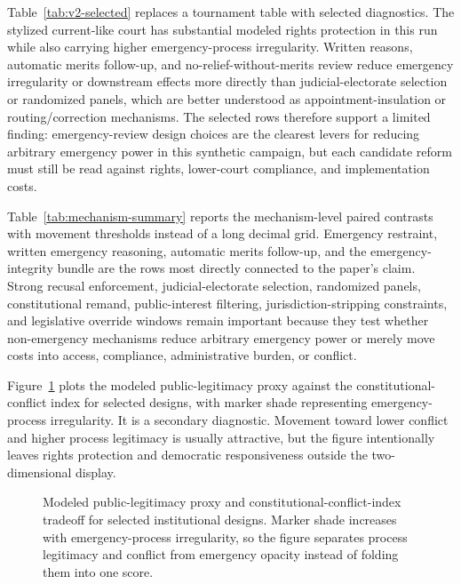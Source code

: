\documentclass[
    journal=jlc,
    manuscript=research-article,
    year=2026,
  ]{cup-journal}
\providecommand{\Description}[1]{}
\begin{document}


Table~\ref{tab:v2-selected} replaces a tournament table with selected diagnostics. The stylized current-like court has substantial modeled rights protection in this run while also carrying higher emergency-process irregularity. Written reasons, automatic merits follow-up, and no-relief-without-merits review reduce emergency irregularity or downstream effects more directly than judicial-electorate selection or randomized panels, which are better understood as appointment-insulation or routing/correction mechanisms. The selected rows therefore support a limited finding: emergency-review design choices are the clearest levers for reducing arbitrary emergency power in this synthetic campaign, but each candidate reform must still be read against rights, lower-court compliance, and implementation costs.



Table~\ref{tab:mechanism-summary} reports the mechanism-level paired contrasts with movement thresholds instead of a long decimal grid. Emergency restraint, written emergency reasoning, automatic merits follow-up, and the emergency-integrity bundle are the rows most directly connected to the paper's claim. Strong recusal enforcement, judicial-electorate selection, randomized panels, constitutional remand, public-interest filtering, jurisdiction-stripping constraints, and legislative override windows remain important because they test whether non-emergency mechanisms reduce arbitrary emergency power or merely move costs into access, compliance, administrative burden, or conflict.

Figure~\ref{fig:conflict-confidence} plots the modeled public-legitimacy proxy against the constitutional-conflict index for selected designs, with marker shade representing emergency-process irregularity. It is a secondary diagnostic. Movement toward lower conflict and higher process legitimacy is usually attractive, but the figure intentionally leaves rights protection and democratic responsiveness outside the two-dimensional display.

\begin{figure}[hbt!]
\centering

\caption{Modeled public-legitimacy proxy and constitutional-conflict-index tradeoff for selected institutional designs. Marker shade increases with emergency-process irregularity, so the figure separates process legitimacy and conflict from emergency opacity instead of folding them into one score.}
\Description{Scatter plot of modeled public-legitimacy proxy against constitutional-conflict index for selected court designs. Higher vertical placement and lower horizontal placement are better, and marker shade increases as emergency-process irregularity rises.}
\label{fig:conflict-confidence}
\end{figure}
\end{document}
